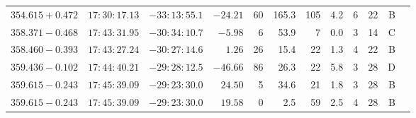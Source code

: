 {\begin{longtable}{c rrr rrrrr rr c}
    $354.615+0.472$     &   $17:30:17.13$     &   $-33:13:55.1$     &   $-24.21  $    &   60     &  165.3    &    105 &   4.2 &   6   &   22  &   B   \\
    $358.371-0.468$     &   $17:43:31.95$     &   $-30:34:10.7$     &   $-5.98   $    &   6      &   53.9    &    7   &   0.0 &   3   &   14  &   C   \\
    $358.460-0.393$     &   $17:43:27.24$     &   $-30:27:14.6$     &   $1.26    $    &   26     &   15.4    &    22  &   1.3 &   4   &   22  &   B   \\
    $359.436-0.102$     &   $17:44:40.21$     &   $-29:28:12.5$     &   $-46.66  $    &   86     &   26.3    &    22  &   5.8 &   3   &   28  &   D   \\
    $359.615-0.243$     &   $17:45:39.09$     &   $-29:23:30.0$     &   $24.50   $    &   5      &   34.6    &    21  &   1.8 &   3   &   28  &   B   \\
    $359.615-0.243$     &   $17:45:39.09$     &   $-29:23:30.0$     &   $19.58   $    &   0      &    2.5    &    59  &   2.5 &   4   &   28  &   B   \\
\end{longtable}
}


